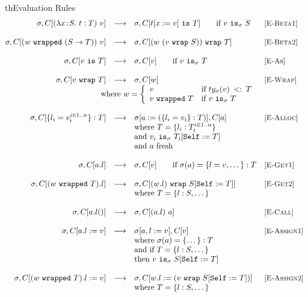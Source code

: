 \documentclass{article}
\newcommand{\lam}[4]{\lambda#1\!:\!#2.\,\,#4:#3}
\newcommand{\lamt}[2]{#1\rightarrow #2}
\newcommand{\app}[2]{#1~#2}
\newcommand{\cast}[2]{#1~\t{is}~#2}
\newcommand{\subtype}[2]{#1 \,\sword\, #2}
\newcommand{\sword}{\mbox{\,\,$<:$\,\,}}
\renewcommand{\t}[1]{{\tt #1}}
\newcommand{\red}[0]{\longrightarrow}  %
\newcommand{\lred}[0]{\red}  %
\newcommand{\objty}[1]{\{#1\}}
\newcommand{\obje}[2]{\{#1\}:{#2}}
\newcommand{\objget}[2]{#1.#2}
\newcommand{\objcall}[2]{#1.#2()}
\newcommand{\objset}[3]{#1.#2:=#3}
\newcommand{\wrapv}[2]{#1~\t{wrapped}~#2}
\newcommand{\wrap}[2]{#1~\t{wrap}~#2}
\newcommand{\allocty}[1]{ty_{\sigma}(#1)}
\newcommand{\istype}[2]{#1~\t{is}_{\sigma}~ #2}
\newcommand{\self}{\t{Self}}
\begin{document}
\begin{displayfigure}{th}{Evaluation Rules}
\label{fig:eval} 
\footnotesize
\[
\begin{array}{@{}rcllr}
	\sigma,C[{\app{(\lam{x}{S}{T}{t})}{v}}]
	&\lred&
	\sigma,C[\cast{t[x:=v]}{T}]
	\qquad\mbox{if $\istype v S$}
	&\rel{E-Beta1}
\\~\\
	\sigma,C[{\app{(\wrapv{w}{(\lamt{S}{T})})}
	              {v}}]
	&\lred&
	\sigma,C[\wrap{(w~(\wrap{v}{S}))}{T}]
	&\rel{E-Beta2}
\\~\\
	\sigma,C[\cast{v}{T}]
	&\lred&
	\sigma,C[v]
	\qquad\mbox{if $\istype{v}{T}$}
	&\rel{E-As}
\\~\\
	\sigma,C[\wrap{v}{T}]
	&\lred&
	\sigma,C[w]
	&\rel{E-Wrap} \\
	\multicolumn{3}{r}{
	\mbox{where $w=\left\{
		\begin{array}{ll}
			v				&\mbox{if $\subtype{\allocty{v}}{T}$} \\
			\wrapv{v}{T}		&\mbox{if $\istype{v}{T}$}
		\end{array}\right.$}}
\\~\\
	\sigma,C[\obje{l_i=v_i^{i\in 1..n}}{T}]
	&\lred&
	\sigma[a:=(\obje{l_i=v_i}{T})],C[a] 
	&\rel{E-Alloc} \\
	&&\mbox{where }T=\objty{l_i:T_i^{i\in 1..n}}  \\
	&&\mbox{and } \istype{v_i}{T_i[\self :=T]} \\
	&&\mbox{and $a$ fresh}
\\~\\
	\sigma,C[\objget{a}{l}]
	&\lred&
	\sigma,C[v]
	\qquad\mbox{if $\sigma(a)=\obje{l=v,\dots}{T}$}
	&\rel{E-Get1}
\\~\\
	\sigma,C[\objget{(\wrapv{w}{T})}{l}]
	&\lred&
	\sigma,C[\wrap{(\objget{w}{l})}{S[\self:=T]}] 
	&\rel{E-Get2} \\
	&&\mbox{where $T=\objty{l:S,\dots}$} 
\\~\\
	\sigma,C[\objcall{a}{l}]
	&\lred&
	\sigma,C[\app{(\objget a l)} a]
	&\rel{E-Call}
\\~\\
	\sigma,C[\objset{a}{l}{v}]
	&\lred&
	\sigma[a,l:=v],C[v] 
	&\rel{E-Assign1} \\
	&&\mbox{where $\sigma(a)=\obje{\dots}{T}$ }\\
	&&\mbox{and if $T=\objty{l:S,\dots}$} \\
	&&\mbox{then $\istype{v}{S[\self:=T]}$} 
\\~\\
	\sigma,C[\objset{(\wrapv{w}{T})}{l}{v}]
	&\lred&
	\sigma,C[\objset{w}{l}{(\wrap{v}{S[\self:=T]})}]
	&\rel{E-Assign2} \\
	&&\mbox{where $T=\objty{l:S,\dots}$} 
\end{array}
\]
\end{displayfigure}
\end{document}
